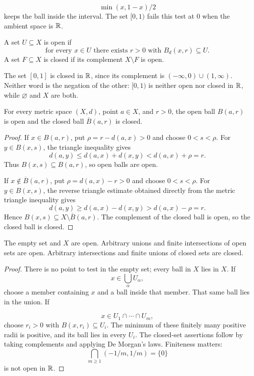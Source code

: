 \[
\min(x,1-x)/2
\]
 keeps the ball inside the interval. The set $[0,1)$
fails this test at $0$ when the ambient space is $\mathbb{R}$.
\begin{definition}
A set $U\subseteq X$ is open if
\[
\text{for every }x\in U\text{ there exists }r>0\text{ with }B_d(x,r)\subseteq U.
\]
A set $F\subseteq X$ is closed if its complement $X\setminus F$ is open.
\end{definition}
The set $[0,1]$ is closed in $\mathbb{R}$, since its complement is
$(-\infty,0)\cup(1,\infty)$. Neither word is the negation of the other:
$[0,1)$ is neither open nor closed in $\mathbb{R}$, while $\varnothing$ and $X$
are both.

\begin{proposition}
\label{prop:metric-balls-open-closed}
For every metric space $(X,d)$, point $a\in X$, and $r>0$, the open ball
$B(a,r)$ is open and the closed ball $\overline B(a,r)$ is closed.
\end{proposition}
\begin{proof}
If $x\in B(a,r)$, put $\rho=r-d(a,x)>0$ and choose $0<s<\rho$. For
$y\in B(x,s)$, the triangle inequality gives
\[
d(a,y)\leq d(a,x)+d(x,y)<d(a,x)+\rho=r.
\]
Thus $B(x,s)\subseteq B(a,r)$, so open balls are open.

If $x\notin\overline B(a,r)$, put $\rho=d(a,x)-r>0$ and choose
$0<s<\rho$. For $y\in B(x,s)$, the reverse triangle estimate obtained
directly from the metric triangle inequality gives
\[
d(a,y)\geq d(a,x)-d(x,y)>d(a,x)-\rho=r.
\]
Hence $B(x,s)\subseteq X\setminus\overline B(a,r)$. The complement of
the closed ball is open, so the closed ball is closed.
\end{proof}

\begin{proposition}\label{prop:metric-open-sets}
The empty set and $X$ are open. Arbitrary unions and finite intersections
of open sets are open. Arbitrary intersections and finite unions of closed
sets are closed.
\end{proposition}
\begin{proof}
There is no point to test in the empty set; every ball in $X$ lies in $X$.
If
\[
x\in\bigcup_\alpha U_\alpha,
\]
 choose a member containing $x$ and a
ball inside that member. That same ball lies in the union. If

\[
x\in U_1\cap\cdots\cap U_m,
\]
 choose $r_i>0$ with $B(x,r_i)\subseteq U_i$.
The minimum of these finitely many positive radii is positive, and its ball
lies in every $U_i$. The closed-set assertions follow by taking complements
and applying De Morgan's laws. Finiteness matters:
\[
\bigcap_{m\geq1}(-1/m,1/m)
=\{0\}
\]
 is not open in $\mathbb{R}$.
\end{proof}

